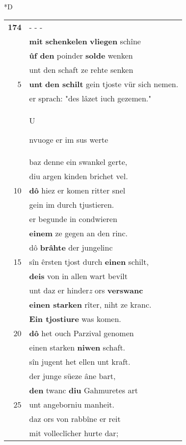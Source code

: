 \documentclass[8pt,a4paper,notitlepage]{article}
\begin{document}
\begin{table}[ht]
\begin{minipage}[t]{0.5\linewidth}
\small
\begin{center}*D
\end{center}
\begin{tabular}{rl}
\textbf{174} & \multicolumn{1}{l}{ - - - }\\ 
 & \textbf{mit} \textbf{schenkelen} \textbf{vliegen} schîne\\ 
 & \textbf{ûf den} poinder \textbf{solde} wenken\\ 
 & unt den schaft ze rehte senken\\ 
5 & \textbf{unt} \textbf{den schilt} gein tjoste vür sich nemen.\\ 
 & er sprach: "des lâzet iuch gezemen."\\ 
 & \begin{large}U\end{large}nvuoge er im sus werte\\ 
 & baz denne ein swankel gerte,\\ 
 & diu argen kinden brichet vel.\\ 
10 & \textbf{dô} hiez er komen ritter snel\\ 
 & gein im durch tjustieren.\\ 
 & er begunde in condwieren\\ 
 & \textbf{einem} ze gegen an den rinc.\\ 
 & dô \textbf{brâhte} der jungelinc\\ 
15 & sîn êrsten tjost durch \textbf{einen} schilt,\\ 
 & \textbf{deis} von in allen wart bevilt\\ 
 & unt daz er hinder\textit{z} ors \textbf{verswanc}\\ 
 & \textbf{einen starken} rîter, niht ze kranc.\\ 
 & \textbf{Ein tjostiure} was komen.\\ 
20 & \textbf{dô} het ouch Parzival genomen\\ 
 & einen starken \textbf{niwen} schaft.\\ 
 & sîn jugent het ellen unt kraft.\\ 
 & der junge süeze âne bart,\\ 
 & \textbf{den} twanc \textbf{diu} Gahmuretes art\\ 
25 & unt angeborniu manheit.\\ 
 & daz ors von rabbîne er reit\\ 
 & mit volleclîcher hurte dar;\\ 

\end{tabular}
\end{minipage}
\end{table}
\end{document}
